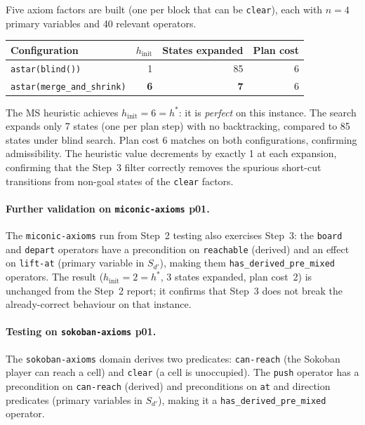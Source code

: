 \documentclass[11pt,a4paper]{article}
\begin{document}
\begin{itemize}
    Five axiom factors are built (one per block that can be \texttt{clear}),
    each with $n = 4$ primary variables and 40 relevant operators.

    \begin{center}
    \begin{tabular}{lrrr}
    \toprule
    \textbf{Configuration} & \textbf{$h_{\mathrm{init}}$}
      & \textbf{States expanded} & \textbf{Plan cost} \\
    \midrule
    \texttt{astar(blind())}            & 1  & 85 & 6 \\
    \texttt{astar(merge\_and\_shrink)} & \textbf{6} & \textbf{7}  & 6 \\
    \bottomrule
    \end{tabular}
    \end{center}

    The MS heuristic achieves $h_{\mathrm{init}} = 6 = h^*$: it is
    \emph{perfect} on this instance.  The search expands only 7 states
    (one per plan step) with no backtracking, compared to 85 states under
    blind search.  Plan cost 6 matches on both configurations, confirming
    admissibility.  The heuristic value decrements by exactly 1 at each
    expansion, confirming that the Step~3 filter correctly removes the
    spurious short-cut transitions from non-goal states of the \texttt{clear}
    factors.

    \paragraph{Further validation on \texttt{miconic-axioms} p01.}

    The \texttt{miconic-axioms} run from Step~2 testing also exercises
    Step~3: the \texttt{board} and \texttt{depart} operators have a
    precondition on \texttt{reachable} (derived) and an effect on
    \texttt{lift-at} (primary variable in $S_{d'}$), making them
    \texttt{has\_derived\_pre\_mixed} operators.  The result
    ($h_{\mathrm{init}} = 2 = h^*$, 3 states expanded, plan cost~2)
    is unchanged from the Step~2 report; it confirms that Step~3 does
    not break the already-correct behaviour on that instance.

    \paragraph{Testing on \texttt{sokoban-axioms} p01.}

    The \texttt{sokoban-axioms} domain derives two predicates:
    \texttt{can-reach} (the Sokoban player can reach a cell) and
    \texttt{clear} (a cell is unoccupied).  The \texttt{push} operator
    has a precondition on \texttt{can-reach} (derived) and preconditions
    on \texttt{at} and direction predicates (primary variables in
    $S_{d'}$), making it a \texttt{has\_derived\_pre\_mixed} operator.


\end{itemize}
\end{document}

